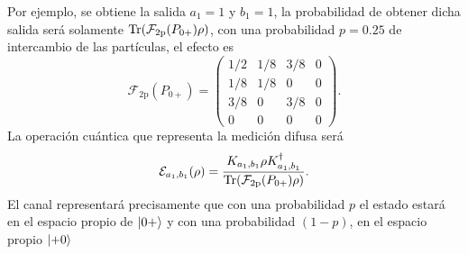 Por ejemplo, se obtiene la salida  $a_1=1$ y  $b_{1}=1$, la probabilidad de obtener dicha salida será solamente \({\rm Tr}(\mathcal{F}_{2\text{p}}(P_{0+})\rho)\), con una probabilidad $p=0.25$ de intercambio de las partículas,  el efecto es \[\mathcal{F}_{2\text{p}}(P_{0+})= \begin{pmatrix}
    1/2 &  1/8 &  3/8 &  0\\
    1/8 &  1/8 &  0 &  0\\
    3/8 &  0 &  3/8 &  0\\
    0&  0&  0&  0
  \end{pmatrix}.\]La operación cuántica que representa la medición difusa será \[\mathcal{E}_{a_1 ,b_1} (\rho) = \dfrac{K_{a_1 ,b_1} \rho K^\dagger_{a_1 ,b_1}}{{\rm Tr}(\mathcal{F}_{2\text{p}}(P_{0+})\rho)}. \]  El canal representará precisamente que con una probabilidad $p$ el estado estará en el espacio propio de $\ket{0+}$ y con una probabilidad $(1 - p)$, en el espacio propio $\ket{+0}$
